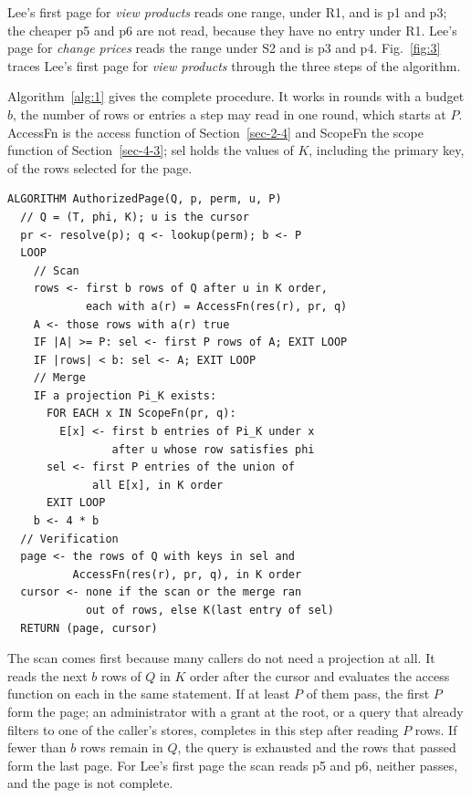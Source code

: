 \documentclass[conference]{IEEEtran}
\begin{document}
Lee's first page for \emph{view products} reads one range, under R1, and is p1 and p3; the cheaper p5 and p6 are not read, because they have no entry under R1. Lee's page for \emph{change prices} reads the range under S2 and is p3 and p4. Fig.~\ref{fig:3} traces Lee's first page for \emph{view products} through the three steps of the algorithm.

Algorithm~\ref{alg:1} gives the complete procedure. It works in rounds with a budget \(b\), the number of rows or entries a step may read in one round, which starts at \(P\). AccessFn is the access function of Section~\ref{sec-2-4} and ScopeFn the scope function of Section~\ref{sec-4-3}; sel holds the values of \(K\), including the primary key, of the rows selected for the page.

\begin{algorithm}[!t]
\caption{Computing a page with ancestor-partitioned index projections.}
\label{alg:1}
\begin{lstlisting}[style=pseudo]
ALGORITHM AuthorizedPage(Q, p, perm, u, P)
  // Q = (T, phi, K); u is the cursor
  pr <- resolve(p); q <- lookup(perm); b <- P
  LOOP
    // Scan
    rows <- first b rows of Q after u in K order,
            each with a(r) = AccessFn(res(r), pr, q)
    A <- those rows with a(r) true
    IF |A| >= P: sel <- first P rows of A; EXIT LOOP
    IF |rows| < b: sel <- A; EXIT LOOP
    // Merge
    IF a projection Pi_K exists:
      FOR EACH x IN ScopeFn(pr, q):
        E[x] <- first b entries of Pi_K under x
                after u whose row satisfies phi
      sel <- first P entries of the union of
             all E[x], in K order
      EXIT LOOP
    b <- 4 * b
  // Verification
  page <- the rows of Q with keys in sel and
          AccessFn(res(r), pr, q), in K order
  cursor <- none if the scan or the merge ran
            out of rows, else K(last entry of sel)
  RETURN (page, cursor)
\end{lstlisting}
\end{algorithm}

The scan comes first because many callers do not need a projection at all. It reads the next \(b\) rows of \(Q\) in \(K\) order after the cursor and evaluates the access function on each in the same statement. If at least \(P\) of them pass, the first \(P\) form the page; an administrator with a grant at the root, or a query that already filters to one of the caller's stores, completes in this step after reading \(P\) rows. If fewer than \(b\) rows remain in \(Q\), the query is exhausted and the rows that passed form the last page. For Lee's first page the scan reads p5 and p6, neither passes, and the page is not complete.
\end{document}

